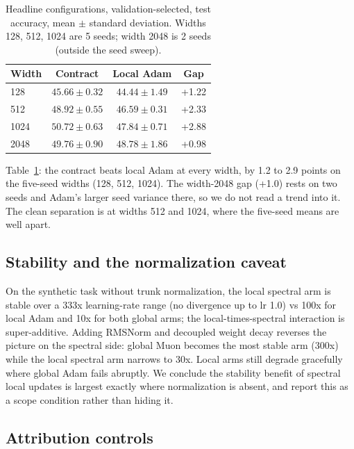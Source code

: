 \documentclass[11pt]{article}
\begin{document}
\begin{table}[t]
\centering
\caption{Headline configurations, validation-selected, test accuracy, mean
$\pm$ standard deviation. Widths 128, 512, 1024 are 5 seeds; width 2048 is 2
seeds (outside the seed sweep).}
\label{tab:seeds}
\begin{tabular}{lccc}
\toprule
Width & Contract & Local Adam & Gap \\
\midrule
128 & $45.66 \pm 0.32$ & $44.44 \pm 1.49$ & +1.22 \\
512 & $48.92 \pm 0.55$ & $46.59 \pm 0.31$ & +2.33 \\
1024 & $50.72 \pm 0.63$ & $47.84 \pm 0.71$ & +2.88 \\
2048 & $49.76 \pm 0.90$ & $48.78 \pm 1.86$ & +0.98 \\
\bottomrule
\end{tabular}
\end{table}

Table~\ref{tab:seeds}: the contract beats local Adam at every width, by 1.2 to 2.9 points on the five-seed widths (128, 512, 1024). The width-2048 gap (+1.0) rests on two seeds and Adam's larger seed variance there, so we do not read a trend into it. The clean separation is at widths 512 and 1024, where the five-seed means are well apart.

\subsection{Stability and the normalization caveat}
\label{sec:stability}

On the synthetic task without trunk normalization, the local spectral arm is stable over a 333x learning-rate range (no divergence up to lr 1.0) vs 100x for local Adam and 10x for both global arms; the local-times-spectral interaction is super-additive. Adding RMSNorm and decoupled weight decay reverses the picture on the spectral side: global Muon becomes the most stable arm (300x) while the local spectral arm narrows to 30x. Local arms still degrade gracefully where global Adam fails abruptly. We conclude the stability benefit of spectral local updates is largest exactly where normalization is absent, and report this as a scope condition rather than hiding it.

\subsection{Attribution controls}
\end{document}
